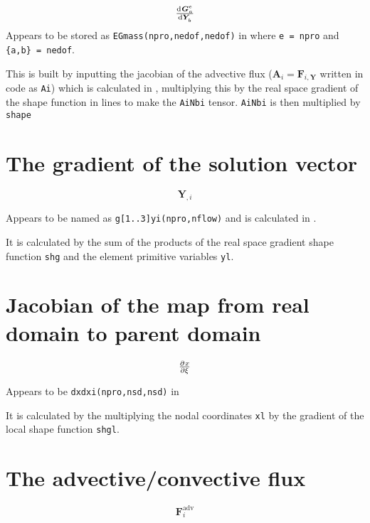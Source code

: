 \documentclass[12pt, letterpaper, twoside]{article}
\renewcommand{\vec}[1]{\bm{#1}}
\newcommand{\ttt}[1]{\texttt{#1}}
\newcommand{\A}{\vec{A}}
\newcommand{\Y}{\vec{Y}}
\newcommand{\F}{\vec{F}}
\newcommand{\G}{\vec{G}}
\newcommand{\0}{\vec{0}}
\begin{document}
    \begin{equation}
        \od{\G^e_a}{\Y_b}
    \end{equation}
    Appears to be stored as \ttt{EGmass(npro,nedof,nedof)} in  where \ttt{e = npro} and \ttt{\{a,b\} = nedof}.

    This is built by inputting the jacobian of the advective flux (\(\A_i = \F_{i,\vec{Y}}\) written in code as \ttt{Ai}) which is calculated in , multiplying this by the real space gradient of the shape function in lines  to make the \ttt{AiNbi} tensor. \ttt{AiNbi} is then multiplied by \ttt{shape}

\section{The gradient of the solution vector}

    \begin{equation}
        \Y_{,i}
    \end{equation}

    Appears to be named as \ttt{g[1..3]yi(npro,nflow)} and is calculated in .

    It is calculated by the sum of the products of the real space gradient shape function \ttt{shg} and the element primitive variables \ttt{yl}.

\section{Jacobian of the map from real domain to parent domain}

    \begin{equation}
        \pd{x}{\xi}
    \end{equation}

    Appears to be \ttt{dxdxi(npro,nsd,nsd)} in  

    It is calculated by the multiplying the nodal coordinates \ttt{xl} by the gradient of the local shape function \ttt{shgl}.

\section{The advective/convective flux}

    \begin{equation}
        \F_i^{\text{adv}}
    \end{equation}
\end{document}

